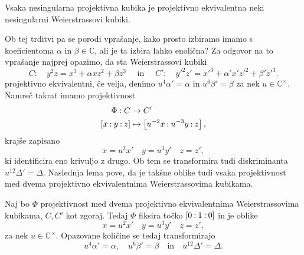 \documentclass[mat1]{fmfdelo}
\newcommand{\C}{\mathbb C}
\newcommand{\CM}{\mathbb C ^\times}
\newcommand{\pcoor}[1]{%
\begingroup\lccode`~=`: \lowercase{\endgroup
\edef~}{\mathbin{\mathchar\the\mathcode`:}\nobreak}%
\left[%
\begingroup
\mathcode`:=\string"8000
#1%
\endgroup
\right]%
}
\theoremstyle{definition}
\begin{document}
\begin{trditev}
    \label{kubika izomorfna neki wnf}
    Vsaka nesingularna projektivna kubika je projektivno ekvivalentna neki nesingularni Weierstrassovi kubiki.  
\end{trditev}

\begin{dokaz}
    \cite[lemma 15.2]{Gibson}
\end{dokaz}

Ob tej trditvi pa se porodi vprašanje, kako prosto izbiramo imamo s koeficientoma $\alpha$ in $\beta \in \C$, ali je ta izbira lahko enolična? Za odgovor na to vprašanje najprej opazimo, da sta Weierstrassovi kubiki 
\[
    C: \quad y^2z = x^3 + \alpha xz^2 + \beta z^3 \quad \text{ in } \quad
    C': \quad y'^2z' = x'^3 + \alpha' x'z'^2 + \beta' z'^3. 
\]
projektivno ekvivalentni, če velja, denimo $u^4 \alpha' = \alpha$ in $u^6 \beta' = \beta$ za nek $u \in \CM$. Namreč takrat imamo projektivnost
\begin{align*}
    \Phi:C &\to C'\\
    \pcoor{x : y : z} &\mapsto \pcoor{u^{-2}x : u^{-3}y : z},
\end{align*}
krajše zapisano 
\[
    x = u^2 x' \quad y = u^3 y' \quad z = z',  
\]
ki identificira eno krivuljo z drugo. Ob tem se transformira tudi diskriminanta $u^{12} \Delta' = \Delta$. Naslednja lema pove, da je takšne oblike tudi vsaka projektivnost med dvema projektivno ekvivalentnima Weierstrassovima kubikama. 
        
\begin{lema}
    \label{projektivnosti wnf}
    Naj bo $\Phi$ projektivnost med dvema projektivno ekvivalentnima Weierstrassovima kubikama, $C, C'$ kot zgoraj. Tedaj $\Phi$ fiksira točko $\pcoor{0 : 1 : 0}$ in je oblike 
    \begin{equation}
        \label{eq:transformacija wnf}
        x = u^2 x' \quad y = u^3 y' \quad z = z',  
    \end{equation}
    za nek $u \in \CM$. Opazovane količine se tedaj transformirajo 
    \[
        u^4 \alpha' = \alpha, \quad u^6 \beta' = \beta \quad \text{in} \quad u^{12} \Delta' = \Delta.
    \]
\end{lema}
\end{document}
